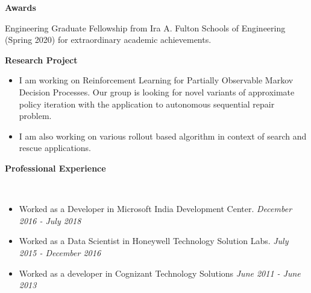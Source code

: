 \documentclass[a4paper,11pt]{article}
\newcommand{\lsep}{-0.5cm}
\newcommand{\resheading}[1]{{\small \colorbox{mygrey}{\begin{minipage}{0.975\textwidth}{\textbf{#1 \vphantom{p\^{E}}}}\end{minipage}}}}
\begin{document}
\resheading{\textbf{\large Awards}}
\begin{description}
	\item \hspace{0.65 cm} Engineering Graduate Fellowship from Ira A. Fulton Schools of Engineering (Spring 2020) for extraordinary academic achievements.
	
\end{description}

\resheading{\textbf{\large Research Project}}
\begin{description}
	\item 
	\begin{itemize}
		\item I am working on Reinforcement Learning for Partially Observable Markov Decision Processes. Our group is looking for novel variants of approximate policy iteration with the application to autonomous sequential repair problem. 
	\end{itemize}
\item 
	\begin{itemize}
		\item I am also working on various rollout based algorithm in context of search and rescue applications.
	\end{itemize}
\end{description}


\resheading{\textbf{\large Professional Experience}}\\[\lsep]
\begin{description}
	\item 
	\begin{itemize}
		\item Worked as a Developer in Microsoft India Development Center. \hfill \textit{December 2016 - July 2018}
	\end{itemize}
	\item 
	\begin{itemize}
		\item Worked as a Data Scientist in Honeywell Technology Solution Labs. \hfill \textit{July 2015 - December 2016}
	\end{itemize}
	\item 
	\begin{itemize}
		\item Worked as a developer in Cognizant Technology Solutions \hfill \textit{June 2011 - June 2013}
	\end{itemize}
\end{description}
\end{document}
